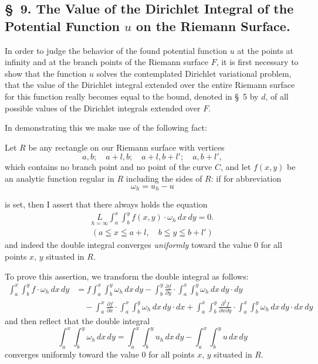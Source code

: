 \documentclass{article}
\begin{document}
\subsection*{§~9. The Value of the Dirichlet Integral of the Potential Function $u$ on the Riemann Surface.}

In order to judge the behavior of the found potential function $u$ at the points at infinity and at the branch points of the Riemann surface $F$, it is first necessary to show that the function $u$ solves the contemplated Dirichlet variational problem, that the value of the Dirichlet integral extended over the entire Riemann surface for this function really becomes equal to the bound, denoted in §~5 by $d$, of all possible values of the Dirichlet integrals extended over $F$.

In demonstrating this we make use of the following fact:

Let $R$ be any rectangle on our Riemann surface with vertices
\[
a, b; \quad a+l, b; \quad a+l, b+l'; \quad a, b+l',
\]
which contains no branch point and no point of the curve $C$, and let $f(x, y)$ be an analytic function regular in $R$ including the sides of $R$: if for abbreviation
\[
\omega_h = u_h - u
\]

is set, then I assert that there always holds the equation
\[
\begin{gathered}
\underset{h=\infty}{L} \int_a^x \int_b^y f(x, y) \cdot \omega_h\,dx\,dy = 0. \\
(a \leqq x \leqq a+l, \quad b \leqq y \leqq b+l')
\end{gathered}
\]
and indeed the double integral converges \emph{uniformly} toward the value 0 for all points $x$, $y$ situated in $R$.

To prove this assertion, we transform the double integral as follows:
\[
\begin{aligned}
\int_a^x \int_b^y f \cdot \omega_h\,dx\,dy &= f \int_a^x \int_b^y \omega_h\,dx\,dy - \int_b^y \frac{\partial f}{\partial y} \cdot \int_a^x \int_b^y \omega_h\,dx\,dy \cdot dy \\
&\quad - \int_a^x \frac{\partial f}{\partial x} \cdot \int_a^x \int_b^y \omega_h\,dx\,dy \cdot dx + \int_a^x \int_b^y \frac{\partial^2 f}{\partial x \partial y} \cdot \int_a^x \int_b^y \omega_h\,dx\,dy \cdot dx\,dy
\end{aligned}
\]
and then reflect that the double integral
\[
\int_a^x \int_b^y \omega_h\,dx\,dy = \int_a^x \int_b^y u_h\,dx\,dy - \int_a^x \int_b^y u\,dx\,dy
\]
converges uniformly toward the value 0 for all points $x$, $y$ situated in $R$.
\end{document}
